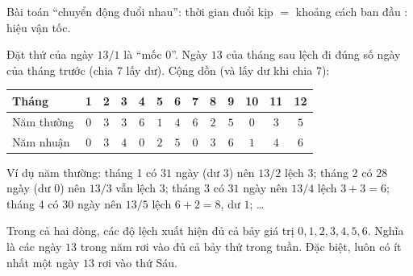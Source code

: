 {\begin{recallbox}Bài toán ``chuyển động đuổi nhau'': thời gian đuổi kịp $=$ khoảng cách ban đầu $:$ hiệu vận tốc.\end{recallbox}
Đặt thứ của ngày $13/1$ là ``mốc $0$''. Ngày $13$ của tháng sau lệch đi đúng số ngày của tháng trước (chia $7$ lấy dư). Cộng dồn
(và lấy dư khi chia $7$):
\begin{center}\scriptsize
\setlength{\tabcolsep}{3.2pt}
\begin{tabular}{|l|c|c|c|c|c|c|c|c|c|c|c|c|}
\hline
\rowcolor{tmBlue!10} Tháng & 1 & 2 & 3 & 4 & 5 & 6 & 7 & 8 & 9 & 10 & 11 & 12\\ \hline
Năm thường & $0$ & $3$ & $3$ & $6$ & $1$ & $4$ & $6$ & $2$ & $5$ & $0$ & $3$ & $5$\\ \hline
Năm nhuận & $0$ & $3$ & $4$ & $0$ & $2$ & $5$ & $0$ & $3$ & $6$ & $1$ & $4$ & $6$\\ \hline
\end{tabular}
\end{center}
Ví dụ năm thường: tháng 1 có $31$ ngày (dư $3$) nên $13/2$ lệch $3$; tháng 2 có $28$ ngày (dư $0$) nên $13/3$ vẫn lệch $3$; tháng 3 có
$31$ ngày nên $13/4$ lệch $3 + 3 = 6$; tháng 4 có $30$ ngày nên $13/5$ lệch $6 + 2 = 8$, dư $1$; \dots
\begin{proofbox}Trong cả hai dòng, các độ lệch xuất hiện đủ cả bảy giá trị $0, 1, 2, 3, 4, 5, 6$. Nghĩa là các ngày $13$ trong năm rơi
vào đủ cả bảy thứ trong tuần. Đặc biệt, luôn có ít nhất một ngày $13$ rơi vào thứ Sáu.\end{proofbox}
}

